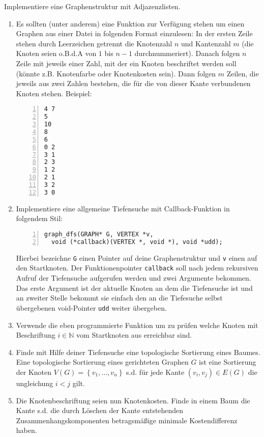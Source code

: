 \begin{aufg}
Implementiere eine Graphenstruktur mit Adjazenzlisten. 
\begin{enumerate}
	\item Es sollten (unter anderem) eine Funktion zur Verfügung stehen um einen Graphen aus einer Datei in folgenden Format einzulesen: In der ersten Zeile stehen durch Leerzeichen getrennt die Knotenzahl $n$ und Kantenzahl $m$ (die Knoten seien o.B.d.A von $1$ bis $n-1$ durchnummeriert). Danach folgen $n$ Zeile mit jeweils einer Zahl, mit der ein Knoten beschriftet werden soll (könnte z.B. Knotenfarbe oder Knotenkosten sein). Dann folgen $m$ Zeilen, die jeweils aus zwei Zahlen bestehen, die für die von dieser Kante verbundenen Knoten stehen. Beispiel:
\begin{codelisting}
\begin{lstlisting}[numbers=left,numberstyle=\tiny,frame=tlrb]
4 7
5
10
8
6
0 2
3 1
2 3
1 2
2 1
3 2
3 0
\end{lstlisting}
\end{codelisting}
	\item Implementiere eine allgemeine Tiefensuche mit Callback-Funktion in folgendem Stil:
\begin{codelisting}
\begin{lstlisting}[numbers=left,numberstyle=\tiny,frame=tlrb]
graph_dfs(GRAPH* G, VERTEX *v, 
  void (*callback)(VERTEX *, void *), void *udd);
\end{lstlisting}
\end{codelisting}
	Hierbei bezeichne \verb|G| einen Pointer auf deine Graphenstruktur und \verb|v| einen auf den Startknoten. Der Funktionenpointer \verb|callback| soll nach jedem rekursiven Aufruf der Tiefensuche aufgerufen werden und zwei Argumente bekommen. Das erste Argument ist der aktuelle Knoten an dem die Tiefensuche ist und an zweiter Stelle bekommt sie einfach den an die Tiefesuche selbst übergebenen void-Pointer \verb|udd| weiter übergeben. 
	\item Verwende die eben programmierte Funktion um zu prüfen welche Knoten mit Beschriftung $i \in \mathbb{N}$ vom Startknoten aus erreichbar sind.
	\item Finde mit Hilfe deiner Tiefensuche eine topologische Sortierung eines Baumes.	Eine topologische Sortierung eines gerichteten Graphen $G$ ist eine Sortierung der Knoten $V(G) = \left\{v_1, \ldots, v_n\right\}$ s.d. für jede Kante $(v_i, v_j) \in E(G)$ die ungleichung  $i < j$ gilt. 
	\item Die Knotenbeschriftung seien nun Knotenkosten. Finde in einem Baum die Kante s.d. die durch Löschen der Kante entstehenden Zusammenhangskomponenten betragsmäßige minimale Kostendifferenz haben.
\end{enumerate}
\end{aufg}